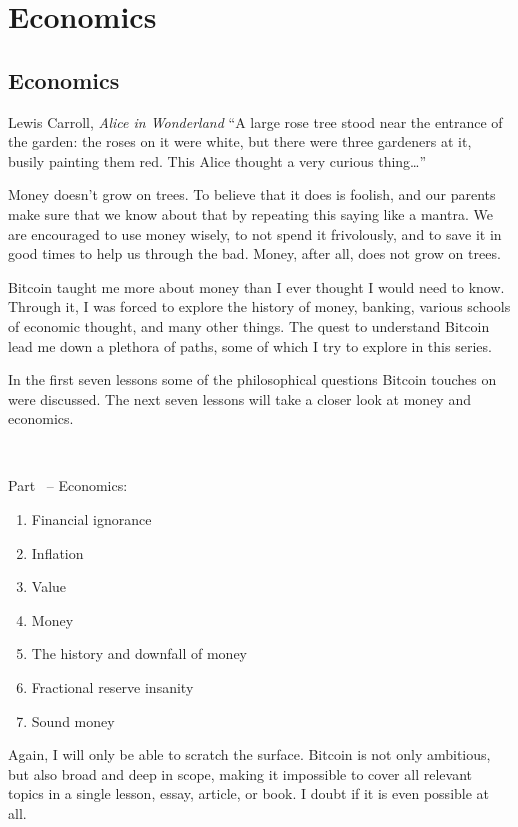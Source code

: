 \part{Economics}
\label{ch:economics}
\chapter*{Economics}

\begin{chapquote}{Lewis Carroll, \textit{Alice in Wonderland}}
``A large rose tree stood near the entrance of the garden: the roses on it were
white, but there were three gardeners at it, busily painting them red. This
Alice thought a very curious thing\ldots''
\end{chapquote}

Money doesn’t grow on trees. To believe that it does is foolish, and our
parents make sure that we know about that by repeating this saying like a
mantra. We are encouraged to use money wisely, to not spend it frivolously,
and to save it in good times to help us through the bad. Money, after all,
does not grow on trees.

Bitcoin taught me more about money than I ever thought I would need to know.
Through it, I was forced to explore the history of money, banking, various
schools of economic thought, and many other things. The quest to understand
Bitcoin lead me down a plethora of paths, some of which I try to explore in
this series.

In the first seven lessons some of the philosophical questions Bitcoin touches
on were discussed. The next seven lessons will take a closer look at money and
economics.

~

Part~\ref{ch:economics} -- Economics:

\begin{enumerate}
  \item Financial ignorance
  \item Inflation
  \item Value
  \item Money
  \item The history and downfall of money
  \item Fractional reserve insanity
  \item Sound money
\end{enumerate}

Again, I will only be able to scratch the surface. Bitcoin is not only
ambitious, but also broad and deep in scope, making it impossible to cover all
relevant topics in a single lesson, essay, article, or book. I doubt if it is
even possible at all.

